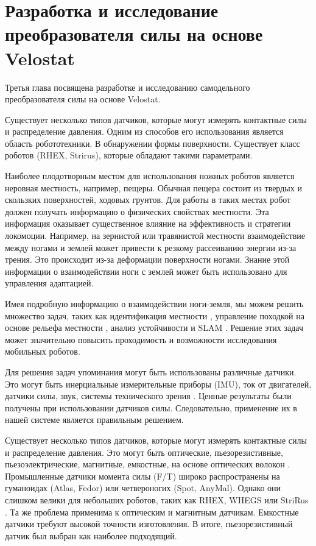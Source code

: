 \chapter{Разработка и исследование преобразователя силы на основе Velostat}\label{ch:ch3}

Третья глава посвящена разработке и исследованию самодельного преобразователя силы на основе Velostat.

Существует несколько типов датчиков, которые могут измерять контактные силы и распределение давления. Одним из способов его использования является область робототехники. В обнаружении формы поверхности. Существует класс роботов (RHEX, Strirus), которые обладают такими параметрами.

Наиболее плодотворным местом для использования ножных роботов является неровная местность, например, пещеры. Обычная пещера состоит из твердых и скользких поверхностей, ходовых грунтов. Для работы в таких местах робот должен получать информацию о физических свойствах местности. Эта информация оказывает существенное влияние на эффективность и стратегии локомоции. Например, на зернистой или травянистой местности взаимодействие между ногами и землей может привести к резкому рассеиванию энергии из-за трения. Это происходит из-за деформации поверхности ногами. Знание этой информации о взаимодействии ноги с землей может быть использовано для управления адаптацией.

Имея подробную информацию о взаимодействии ноги-земля, мы можем решить множество задач, таких как идентификация местности \cite{wu_integrated_2016, walas_terrain_2015, mrva_feature_2015, dallaire_learning_2015}, управление походкой на основе рельефа местности \cite{wu_tactile_2020, weingarten_automated_2004}, анализ устойчивости и SLAM \cite{odenthal_nonlinear_1999, peters_analysis_2006, saranli_design_2000}. Решение этих задач может значительно повысить проходимость и возможности исследования мобильных роботов.

Для решения задач упоминания могут быть использованы различные датчики. Это могут быть инерциальные измерительные приборы (IMU), ток от двигателей, датчики силы, звук, системы технического зрения \cite{libby_using_2012,ojeda_terrain_2006,peters_analysis_2006}. Ценные результаты были получены при использовании датчиков силы. Следовательно, применение их в нашей системе является правильным решением.

Существует несколько типов датчиков, которые могут измерять контактные силы и распределение давления. Это могут быть оптические, пьезорезистивные, пьезоэлектрические, магнитные, емкостные, на основе оптических волокон \cite{howe_dynamic_1993}. Промышленные датчики момента силы (F/T) широко распространены на гуманоидах (Atlas, Fedor) или четвероногих (Spot, AnyMal). Однако они слишком велики для небольших роботов, таких как RHEX, WHEGS или StriRus \cite{saranli_rhex_2001,schroer_comparing_2004, bulichev_concept_2018}. Та же проблема применима к оптическим и магнитным датчикам. Емкостные датчики требуют высокой точности изготовления. В итоге, пьезорезистивный датчик был выбран как наиболее подходящий.

